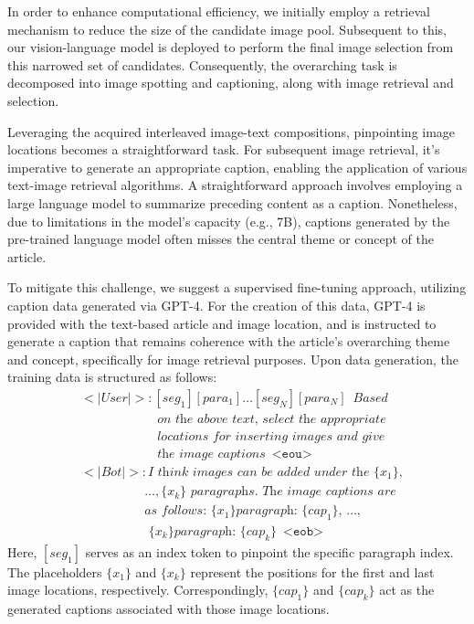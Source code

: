 \documentclass[10pt,twocolumn,letterpaper]{article}
\begin{document}
In order to enhance computational efficiency, we initially employ a retrieval mechanism to reduce the size of the candidate image pool. Subsequent to this, our vision-language model is deployed to perform the final image selection from this narrowed set of candidates. Consequently, the overarching task is decomposed into image spotting and captioning, along with image retrieval and selection.

Leveraging the acquired interleaved image-text compositions, pinpointing image locations becomes a straightforward task. For subsequent image retrieval, it's imperative to generate an appropriate caption, enabling the application of various text-image retrieval algorithms. A straightforward approach involves employing a large language model to summarize preceding content as a caption. Nonetheless, due to limitations in the model's capacity (e.g., 7B), captions generated by the pre-trained language model often misses the central theme or concept of the article. 


To mitigate this challenge, we suggest a supervised fine-tuning approach, utilizing caption data generated via GPT-4. For the creation of this data, GPT-4 is provided with the text-based article and image location, and is instructed to generate a caption that remains coherence with the article's overarching theme and concept, specifically for image retrieval purposes. Upon data generation, the training data is structured as follows:
\begin{align*}
& <|User|>: [seg_1][para_1]\ldots[seg_N][para_N] \enspace \textit{Based}\\
& \quad\quad\quad\quad\quad\quad \textit{on the above text, select the appropriate} \\
& \quad\quad\quad\quad\quad\quad \textit{locations for inserting images and give} \\
& \quad\quad\quad\quad\quad\quad \textit{the image captions} \enspace \texttt{<eou>}  \\
& <|Bot|>: \textit{I think images can be added under the \{$x_1\},$}\\
& \quad\quad\quad\quad\quad \textit{$\ldots, \{x_k\}$ paragraphs. The image captions are} \\
& \quad\quad\quad\quad\quad \textit{as follows: \{$x_1$\} paragraph: \{$cap_1$\}, $\ldots$}, \\
& \quad\quad\quad\quad\quad \textit{ \{$x_k$\} paragraph: \{$cap_k$\}} \enspace \texttt{<eob>}
\end{align*}
Here, \( [seg_1] \) serves as an index token to pinpoint the specific paragraph index. The placeholders \( \{x_1\} \) and \( \{x_k\} \) represent the positions for the first and last image locations, respectively. Correspondingly, \( \{cap_1\} \) and \( \{cap_k\} \) act as the generated captions associated with those image locations.
\end{document}
